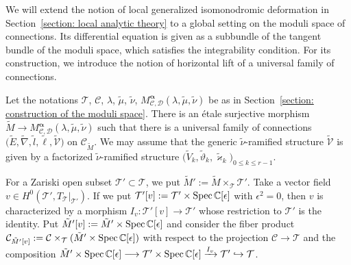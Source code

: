 \documentclass[pdftex]{sigma}
\numberwithin{equation}{section}
\newcommand\Spec{\mathop{\rm Spec}\nolimits}
\newcommand{\balpha}{\boldsymbol \alpha}
\begin{document}
We will extend the notion of local generalized isomonodromic deformation
in Section~\ref{section: local analytic theory}
to a global setting on the moduli space of connections.
Its differential equation is given as a subbundle of the tangent bundle of the moduli space,
which satisfies the integrability condition.
For its construction, we introduce the notion of horizontal lift of
a universal family of connections.

Let the notations
${\mathcal T}$, ${\mathcal C}$, $\lambda$, $\tilde{\mu}$, $\tilde{\nu}$,
$M^{\balpha}_{{\mathcal C},{\mathcal D}}(\lambda,\tilde{\mu},\tilde{\nu})$
be as in Section~\ref{section: construction of the moduli space}.
There is an \'etale surjective morphism
$\tilde{M}\longrightarrow M^{\balpha}_{{\mathcal C},{\mathcal D}}(\lambda,\tilde{\mu},\tilde{\nu})$
such that there is a universal family of
connections
$\big(\tilde{E},\tilde{\nabla},\tilde{l},\tilde{\ell},\tilde{\mathcal V}\big)$
on ${\mathcal C}_{\tilde{M}}$.
We may assume that
the generic $\tilde{\nu}$-ramified structure
$\tilde{\mathcal V}$ is given by a factorized $\tilde{\nu}$-ramified structure
$\big(\tilde{V}_k,\tilde{\vartheta}_k,\tilde{\varkappa}_k\big)_{0\leq k\leq r-1}$.

For a Zariski open subset
${\mathcal T'}\subset {\mathcal T}$,
we put $\tilde{M}':=\tilde{M}\times_{\mathcal T}{\mathcal T'}$.
Take a vector field
$v\in H^0({\mathcal T}',T_{\mathcal T}|_{\mathcal T'})$.
If we put
${\mathcal T}'[v]:={\mathcal T}'\times\Spec\mathbb{C}[\epsilon]$
with $\epsilon^2=0$,
then $v$ is characterized by a morphism
$I_v\colon {\mathcal T}'[v]\longrightarrow{\mathcal T'}$
whose restriction to ${\mathcal T'}$ is the identity.
Put
$\tilde{M}'[v]:=\tilde{M}'\times\Spec\mathbb{C}[\epsilon]$
and consider the fiber product
${\mathcal C}_{\tilde{M}'[v]}:=
{\mathcal C}\times_{\mathcal T} (\tilde{M}'\times\Spec\mathbb{C}[\epsilon])$
with respect to the projection
${\mathcal C}\longrightarrow {\mathcal T}$
and the composition
$\tilde{M}'\times\Spec\mathbb{C}[\epsilon]
\longrightarrow {\mathcal T'}\times\Spec\mathbb{C}[\epsilon]
\xrightarrow{I_v} {\mathcal T'}\hookrightarrow {\mathcal T}$.
\end{document}

